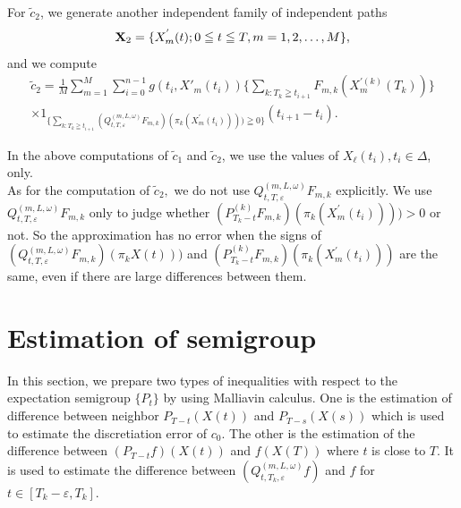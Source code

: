 \documentclass[12pt]{article}
\begin{document}
For $\tilde{c}_2$, we generate another independent family of independent paths $${\bf X}_2=\{X^{'}_{m }(t); 0 \leqq t \leqq T,  m =1,2,\ldots ,M\},$$
and we compute 
\begin{multline*}
\tilde{c}_2= \frac{1}{M} \sum_{m=1}^M \sum_{i=0}^{n-1} g(t_i, X'_m(t_i)) \{ \sum_{k:T_k\geqq t_{i+1}}F_{m,k}(X_m^{'(k)}(T_k))\}\\
 \times 1_{\{\sum_{k:T_k\geqq t_{i+1}} (Q_{t,T,\varepsilon}^{(m,L,\omega)}F_{m,k})(\pi_k(X^{'}_m(t_i)))) \geqq 0\}}(t_{i+1}-t_i).
 \end{multline*}

In the above computations of $\tilde{c}_1$ and $\tilde{c}_2$, we use the values of $X_{\ell}(t_i), t_i \in \Delta$, only.\\
As for the computation of $\tilde{c}_2,$  we do not use $Q_{t,T,\varepsilon}^{(m,L,\omega)}F_{m,k}$ explicitly.
We use $Q_{t,T,\varepsilon}^{(m,L,\omega)}F_{m,k}$ only to judge whether $(P^{(k)}_{T_k-t} F_{m,k})(\pi_k(X^{'}_m(t_i))))>0$ or not. 
 So the approximation has no error when the signs of  $(Q_{t,T,\varepsilon}^{(m,L,\omega)} F_{m,k})(\pi_k{X}(t)))$ and $(P^{(k)}_{T_k-t} F_{m,k})(\pi_k(X^{'}_m(t_i)))$ are the same, even if there are large differences between them.

 \section{Estimation of semigroup}\label{sec:mall}
 In this section, we prepare two types of inequalities with respect to 
the expectation semigroup $\{P_t\}$ by using Malliavin calculus.
One is the estimation of difference between neighbor
$P_{T-t}(X(t))$ and $P_{T-s}(X(s))$ which is used to estimate the discretiation
error of $c_0$. The other is the estimation of the difference between 
$(P_{T-t}f)(X(t))$ and $f(X(T))$ where $t$ is close to $T$. It is used to estimate 
the difference between $(Q_{t,T_k,\varepsilon}^{(m,L,\omega)}f)$ and $f$ for $t \in [T_k -\varepsilon
, T_k].$
\end{document}
